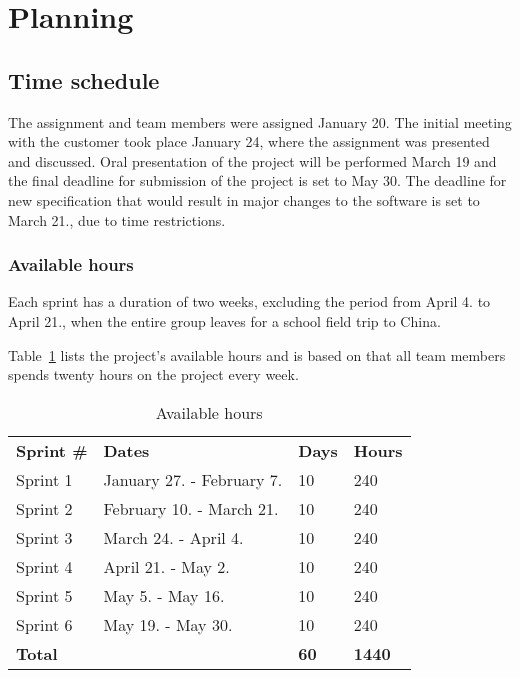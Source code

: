 \section{Planning}
\subsection{Time schedule}
The assignment and team members were assigned January 20. The initial meeting with the customer took place January 24, where the assignment was presented and discussed. Oral presentation of the project will be performed March 19 and the final deadline for submission of the project is set to May 30. The deadline for new specification that would result in major changes to the software is set to March 21., due to time restrictions.

\subsubsection{Available hours}
Each sprint has a duration of two weeks, excluding the period from April 4. to April 21., when the entire group leaves for a school field trip to China.

Table~\ref{tab:availHours} lists the project's available hours and is based on  that all team members spends twenty hours on the project every week.

\begin{table}[H]
\centering
{}
\begin{tabular}{|l|l|l|l|}
\hline
\textbf{Sprint \#} & \textbf{Dates} & \textbf{Days} & \textbf{Hours}\\
Sprint 1& January 27. - February 7. & 10  & 240 \\
Sprint 2 & February 10. - March 21. &10  & 240 \\
Sprint 3 & March 24. - April 4. &10 & 240 \\
Sprint 4 & April 21. - May 2. &10  &240 \\
Sprint 5 & May 5. - May 16. &10&  240 \\
Sprint 6 & May 19. - May 30. &10  &240 \\
\textbf{Total}&& \textbf{60}&  \textbf{1440}\\\hline
\end{tabular}
\caption{Available hours}
\label{tab:availHours}
\end{table}

